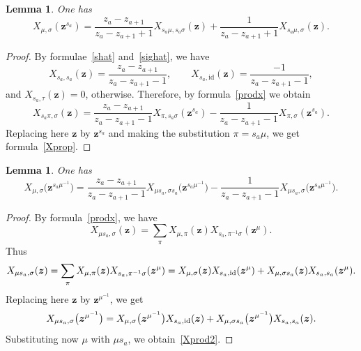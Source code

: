 \documentclass[10pt,a4paper]{amsart}
\numberwithin{equation}{section}
\newtheorem{Lemma}[Theorem]{Lemma}
\newcommand{\id}{\mathrm{id}}
\begin{document}
\begin{Lemma}
One has
\begin{equation}\label{Xprop}
X_{\mu,\sigma}(\boldsymbol{z}^{s_a})=\frac{z_{a}-z_{a+1}}{z_{a}-z_{a+1}+1}X_{s_a\mu,s_a\sigma}(\boldsymbol{z} )+\frac{1}{z_{a}-z_{a+1}+1}X_{s_a\mu,\sigma}(\boldsymbol{z} ).
\end{equation}
\end{Lemma}
\begin{proof}By formulae~\eqref{shat} and~\eqref{sighat}, we have
\begin{equation*}
X_{s_a,s_a}(\boldsymbol{z})=\frac{z_a-z_{a+1}}{z_a-z_{a+1}-1}, \qquad X_{s_a,\id}(\boldsymbol{z})=\frac{-1}{z_a-z_{a+1}-1},
\end{equation*}
and $X_{s_a,\tau}(\boldsymbol{z})=0$, otherwise. Therefore, by formula~\eqref{prodx} we obtain
\begin{equation*}
X_{s_a\pi,\sigma}(\boldsymbol{z})=\frac{z_{a}-z_{a+1}}{z_{a}-z_{a+1}-1}X_{\pi,s_a\sigma}(\boldsymbol{z}^{s_a})-\frac{1}{z_a-z_{a+1}-1}X_{\pi,\sigma}(\boldsymbol{z}^{s_a}).
\end{equation*}
Replacing here $\boldsymbol{z}$ by $\boldsymbol{z}^{s_a}$ and making the substitution $\pi=s_a\mu$, we get formula~\eqref{Xprop}.
\end{proof}

\begin{Lemma} One has
\begin{equation}\label{Xprod2}
X_{\mu,\sigma }\bigl(\boldsymbol{z}^{s_a\mu^{-1}}\bigr)= \frac{z_{a}-z_{a+1}}{z_{a}-z_{a+1}-1} X_{\mu s_a,\sigma s_a} \bigl(\boldsymbol{z}^{s_a\mu^{-1}}\bigr)-\frac{1}{z_{a}-z_{a+1}-1}X_{\mu s_a,\sigma }\bigl(\boldsymbol{z}^{s_a\mu^{-1}}\bigr).
\end{equation}
\end{Lemma}
\begin{proof}
By formula~\eqref{prodx}, we have
\begin{equation*}
X_{\mu s_a,\sigma }(\boldsymbol{z})=\sum_{\pi} X_{\mu,\pi} (\boldsymbol{z})X_{s_a,\pi^{-1}\sigma } (\boldsymbol{z}^{\mu}).
\end{equation*}
Thus
\begin{equation*}
X_{\mu s_a,\sigma }(\boldsymbol{z})=\sum_{\pi} X_{\mu,\pi} (\boldsymbol{z})X_{s_a,\pi^{-1}\sigma } (\boldsymbol{z}^{\mu})=X_{\mu,\sigma } (\boldsymbol{z})X_{s_a, {\rm id}} (\boldsymbol{z}^{\mu})+X_{\mu,\sigma s_a} (\boldsymbol{z})X_{s_a, s_a} (\boldsymbol{z}^{\mu}).
\end{equation*}
Replacing here $\boldsymbol{z}$ by $\boldsymbol{z}^{\mu^{-1}}$, we get
\begin{equation*}
X_{\mu s_a,\sigma }\bigl(\boldsymbol{z}^{\mu^{-1}}\bigr)=X_{\mu,\sigma } \bigl(\boldsymbol{z}^{\mu^{-1}}\bigr)X_{s_a,{\rm id}} (\boldsymbol{z} )+X_{\mu,\sigma s_a} \bigl(\boldsymbol{z}^{\mu^{-1}}\bigr)X_{s_a, s_a} (\boldsymbol{z} ).
\end{equation*}
Substituting now $\mu$ with $\mu s_a$, we obtain~\eqref{Xprod2}.
\end{proof}
\end{document}
